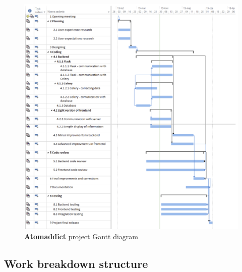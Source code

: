 \documentclass[12pt]{article}
\begin{document}
\begin{figure}[H]
    \centering
    \includegraphics[width=\textwidth]{images/gantt.png}
    \caption{\textbf{Atomaddict} project Gantt diagram}
\end{figure}


\subsection{Work breakdown structure}
\end{document}
